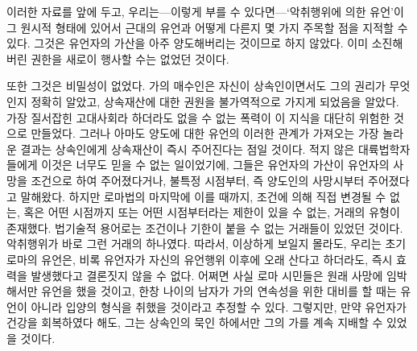 이러한 자료를 앞에 두고,
우리는---이렇게 부를 수 있다면---`악취행위에 의한 유언'이
그 원시적 형태에 있어서 근대의 유언과 어떻게 다른지 몇 가지 주목할 점을
지적할 수 있다.
그것은 유언자의 가산을 아주 양도해버리는 것이므로
하지 않았다.
이미 소진해버린 권한을 새로이 행사할 수는 없었던 것이다.

또한 그것은 비밀성이 없었다.
가의 매수인은 자신이 상속인이면서도 그의 권리가 무엇인지 정확히 알았고,
상속재산에 대한 권원을 불가역적으로 가지게 되었음을 알았다.
가장 질서잡힌 고대사회라 하더라도 없을 수 없는 폭력이 이 지식을 대단히
위험한 것으로 만들었다.
그러나 아마도 양도에 대한 유언의 이러한 관계가 가져오는 가장 놀라운 결과는
상속인에게 상속재산이 즉시 주어진다는 점일 것이다.
적지 않은 대륙법학자들에게 이것은 너무도 믿을 수 없는 일이었기에,
그들은 유언자의 가산이 유언자의 사망을 조건으로 하여 주어졌다거나,
불특정 시점부터, 즉 양도인의 사망시부터 주어졌다고 말해왔다.
하지만 로마법의 마지막에 이를 때까지,
조건에 의해 직접 변경될 수 없는, 혹은
어떤 시점까지 또는 어떤 시점부터라는 제한이 있을 수 없는,
거래의 유형이 존재했다.
법기술적 용어로는 조건이나
기한이 붙을 수 없는 거래들이 있었던 것이다.
악취행위가 바로 그런 거래의 하나였다.
따라서, 이상하게 보일지 몰라도, 우리는 초기 로마의 유언은,
비록 유언자가 자신의 유언행위 이후에 오래 산다고 하더라도,
즉시 효력을 발생했다고 결론짓지 않을 수 없다.
어쩌면 사실 로마 시민들은 원래 사망에 임박해서만 유언을 했을 것이고,
한창 나이의 남자가 가의 연속성을 위한 대비를 할 때는
유언이 아니라 입양의 형식을 취했을 것이라고 추정할 수 있다.
그렇지만, 만약 유언자가 건강을 회복하였다 해도,
그는 상속인의 묵인 하에서만 그의 가를 계속 지배할 수 있었을 것이다.


